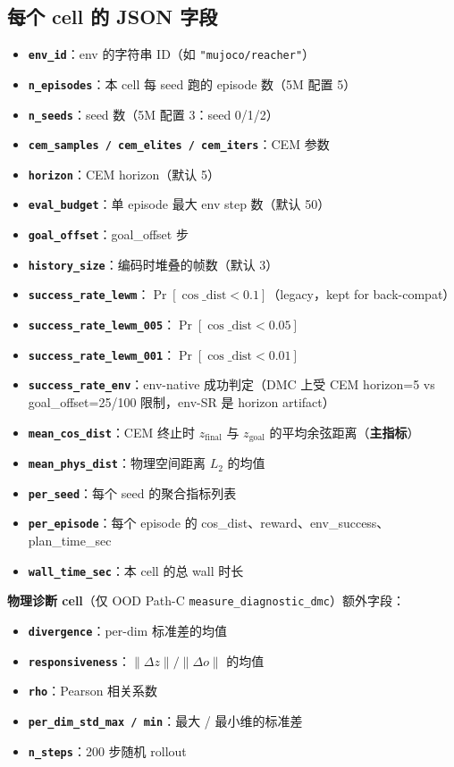 \documentclass[11pt,a4paper]{article}
\begin{document}
\subsection{每个 cell 的 JSON 字段}
\begin{itemize}[leftmargin=2em]
    \item \textbf{\texttt{env\_id}}：env 的字符串 ID（如 \texttt{"mujoco/reacher"}）
    \item \textbf{\texttt{n\_episodes}}：本 cell 每 seed 跑的 episode 数（5M 配置 5）
    \item \textbf{\texttt{n\_seeds}}：seed 数（5M 配置 3：seed 0/1/2）
    \item \textbf{\texttt{cem\_samples / cem\_elites / cem\_iters}}：CEM 参数
    \item \textbf{\texttt{horizon}}：CEM horizon（默认 5）
    \item \textbf{\texttt{eval\_budget}}：单 episode 最大 env step 数（默认 50）
    \item \textbf{\texttt{goal\_offset}}：goal\_offset 步
    \item \textbf{\texttt{history\_size}}：编码时堆叠的帧数（默认 3）
    \item \textbf{\texttt{success\_rate\_lewm}}：$\Pr[\cos\_\text{dist} < 0.1]$（legacy，kept for back-compat）
    \item \textbf{\texttt{success\_rate\_lewm\_005}}：$\Pr[\cos\_\text{dist} < 0.05]$
    \item \textbf{\texttt{success\_rate\_lewm\_001}}：$\Pr[\cos\_\text{dist} < 0.01]$
    \item \textbf{\texttt{success\_rate\_env}}：env-native 成功判定（DMC 上受 CEM horizon=5 vs goal\_offset=25/100 限制，env-SR 是 horizon artifact）
    \item \textbf{\texttt{mean\_cos\_dist}}：CEM 终止时 $z_\text{final}$ 与 $z_\text{goal}$ 的平均余弦距离（\textbf{主指标}）
    \item \textbf{\texttt{mean\_phys\_dist}}：物理空间距离 $L_2$ 的均值
    \item \textbf{\texttt{per\_seed}}：每个 seed 的聚合指标列表
    \item \textbf{\texttt{per\_episode}}：每个 episode 的 cos\_dist、reward、env\_success、plan\_time\_sec
    \item \textbf{\texttt{wall\_time\_sec}}：本 cell 的总 wall 时长
\end{itemize}

\textbf{物理诊断 cell}（仅 OOD Path-C \texttt{measure\_diagnostic\_dmc}）额外字段：
\begin{itemize}[leftmargin=2em]
    \item \textbf{\texttt{divergence}}：per-dim 标准差的均值
    \item \textbf{\texttt{responsiveness}}：$\|\Delta z\| / \|\Delta o\|$ 的均值
    \item \textbf{\texttt{rho}}：Pearson 相关系数
    \item \textbf{\texttt{per\_dim\_std\_max / min}}：最大 / 最小维的标准差
    \item \textbf{\texttt{n\_steps}}：200 步随机 rollout
\end{itemize}
\end{document}
